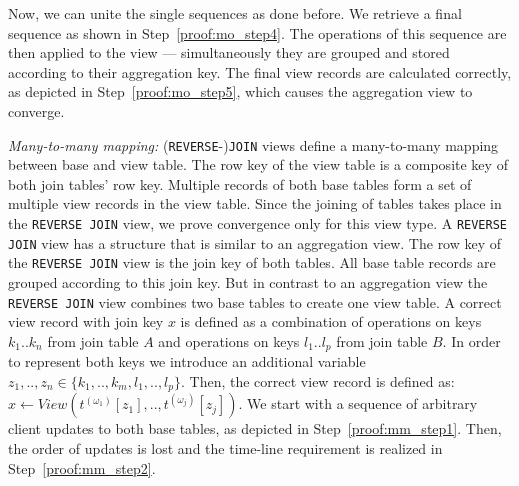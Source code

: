%
Now, we can unite the single sequences as done before. We retrieve a 
final sequence as shown in Step~\ref{proof:mo_step4}. The operations of 
this sequence are then applied to the view --- simultaneously they are 
grouped and stored according to their aggregation key. The final view 
records are calculated correctly, as depicted in 
Step~\ref{proof:mo_step5}, which causes the aggregation view to 
converge. 

\textit{Many-to-many mapping:} (\texttt{REVERSE}-)\texttt{JOIN} views 
define a many-to-many mapping between base and view table. The row key 
of the view table is a composite key of both join tables' row key. 
Multiple records of both base tables form a set of multiple view records 
in the view table. Since the joining of tables takes place in the 
\texttt{REVERSE JOIN} view, we prove convergence only for this view 
type. A \texttt{REVERSE JOIN} view has a structure that is similar to an 
aggregation view. The row key of the \texttt{REVERSE JOIN} view is the 
join key of both tables. All base table records are grouped according to 
this join key. But in contrast to an aggregation view the 
\texttt{REVERSE JOIN} view combines two base tables to create one view 
table. A correct view record with join key $x$ is defined as a 
combination of operations on keys $k_1..k_n$ from join table $A$ and 
operations on keys $l_1..l_p$ from join table $B$. In order to represent 
both keys we introduce an additional variable $z_1,..,z_n \in 
\{k_1,..,k_m, l_1,..,l_p\}$. Then, the correct view record is defined 
as: $x \leftarrow View(t^{(\omega_1)}[z_1], ..,t^{(\omega_j)}[z_j])$. 
We start with a sequence of arbitrary client updates to both base 
tables, as depicted in Step~\ref{proof:mm_step1}. Then, the order of 
updates is lost and the time-line requirement is realized in 
Step~\ref{proof:mm_step2}. 
%
